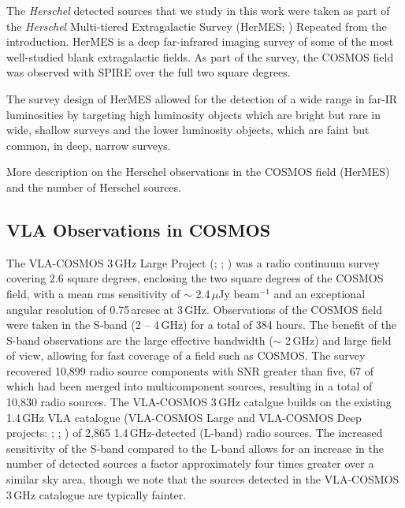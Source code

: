 The \textit{Herschel} detected sources that we study in this work were taken as part of the \textit{Herschel} Multi-tiered Extragalactic Survey (HerMES; \citealt{Oliver_2012}) {\color{red}Repeated from the introduction}. HerMES is a deep far-infrared imaging survey of some of the most well-studied blank extragalactic fields. As part of the survey, the COSMOS field was observed with SPIRE over the full two square degrees.

The survey design of HerMES allowed for the detection of a wide range in far-IR luminosities by targeting high luminosity objects which are bright but rare in wide, shallow surveys and the lower luminosity objects, which are faint but common, in deep, narrow surveys.

{\color{red}More description on the Herschel observations in the COSMOS field (HerMES) and the number of Herschel sources.}

\subsection{VLA Observations in COSMOS}

The VLA-COSMOS 3\,GHz Large Project (\citealt{Smolcic_2017a}; \citealt{Smolcic_2017b}; \citealt{Smolcic_2017c}) was a radio continuum survey covering 2.6 square degrees, enclosing the two square degrees of the COSMOS field, with a mean rms sensitivity of $\sim$ 2.4\,$\mu$Jy beam$^{-1}$ and an exceptional angular resolution of 0.75\,arcsec at 3\,GHz. Observations of the COSMOS field were taken in the S-band (2 -- 4\,GHz) for a total of 384 hours. The benefit of the S-band observations are the large effective bandwidth ($\sim$ 2\,GHz) and large field of view, allowing for fast coverage of a field such as COSMOS. The survey recovered 10,899 radio source components with SNR greater than five, 67 of which had been merged into multicomponent sources, resulting in a total of 10,830 radio sources. The VLA-COSMOS 3\,GHz catalgue builds on the existing 1.4\,GHz VLA catalogue (VLA-COSMOS Large and VLA-COSMOS Deep projects: \citealt{Schinnerer_2004}; \citealt{Schinnerer_2007}; \citealt{Schinnerer_2010}) of 2,865 1.4\,GHz-detected (L-band) radio sources. The increased sensitivity of the S-band compared to the L-band allows for an increase in the number of detected sources a factor approximately four times greater over a similar sky area, though we note that the sources detected in the VLA-COSMOS 3\,GHz catalogue are typically fainter.

